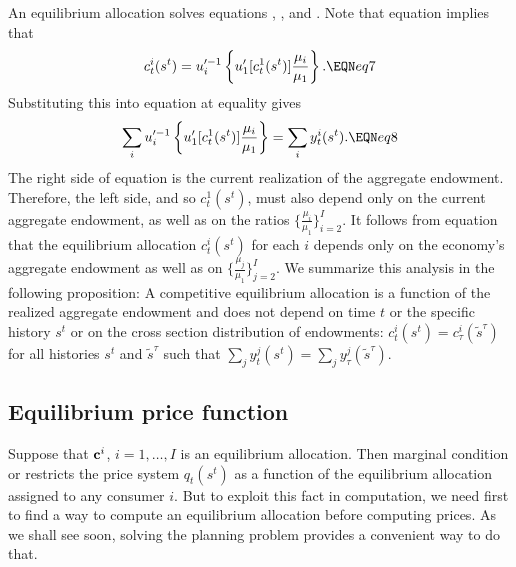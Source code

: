 An equilibrium allocation solves equations  ,  ,
and . Note that equation  implies that
$$ c_t^i(s^t) = u^{\prime -1}_i  \left\{u'_1[c_t^1(s^t)] {\mu_i \over \mu_1}
 \right\}. \EQN eq7 $$
Substituting this into equation  at equality gives
$$ \sum_i
u^{\prime -1}_i  \left\{u'_1[c_t^1(s^t)] {\mu_i \over \mu_1}\right\} =
       \sum_i y_t^i(s^t) .  \EQN eq8 $$
The right side of equation  is the current realization of
the aggregate endowment. %
Therefore, the left
side, and  so $c_t^1(s^t)$,  must also depend only on the current
aggregate endowment, as well as on the ratios
$\{ {\frac{\mu_i}{\mu_1}} \}_{i=2}^I$.  It follows from equation  that the
equilibrium allocation $c_t^i(s^t)$ for each $i$ depends only on
the economy's aggregate endowment as well as on
$\{ {\frac{\mu_j}{\mu_1}} \}_{j=2}^I$. We summarize this analysis  in
the following proposition:
\medskip
{}  A competitive equilibrium allocation
is a function of the realized aggregate endowment and does not depend
on time $t$ or the specific history $s^t$ or on
the cross section distribution of endowments:
$c_t^i(s^t)=c_\tau^i(\tilde s^{\tau})$ for all histories $s^t$ and $\tilde
s^{\tau}$ such that $\sum_j y_t^j(s^t) = \sum_j y_\tau^j(\tilde
s^{\tau})$.


\medskip








\subsection{Equilibrium price function}
  Suppose that ${\bf c}^i$, $i=1, \ldots, I$  is an equilibrium allocation.
Then    marginal condition  or  restricts
the price system $q_t(s^t)$ as a function of the equilibrium allocation assigned
to any consumer $i$. But to exploit this fact in computation, we need  first to find a way  to compute
an equilibrium allocation before  computing prices.  As we shall see soon, solving the planning problem provides a convenient way
to do that.


